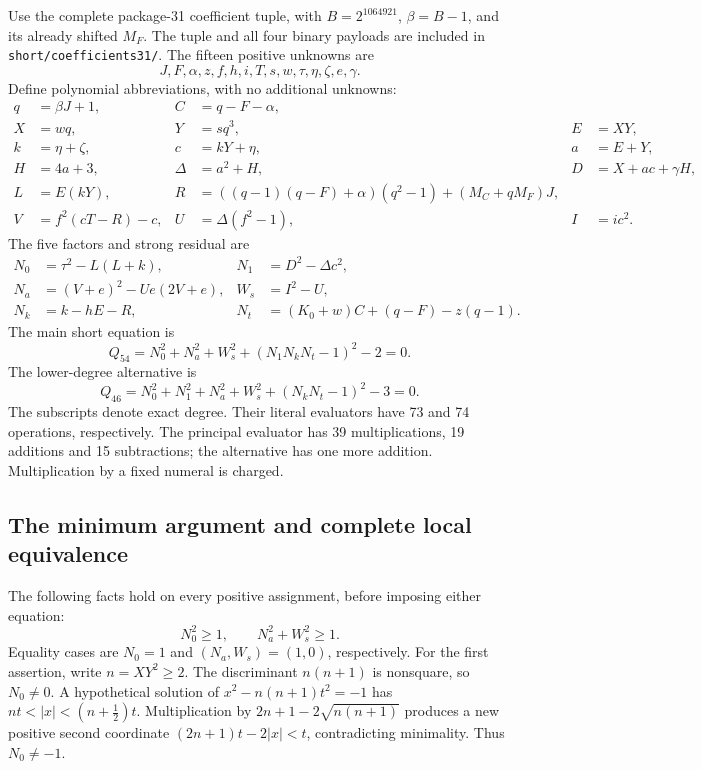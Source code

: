 Use the complete package-31 coefficient tuple, with $B=2^{1064921}$,
$\beta=B-1$, and its already shifted $M_F$. The tuple and all four binary
payloads are included in \texttt{short/coefficients31/}.
The fifteen positive unknowns are
\[
 J,F,\alpha,z,f,h,i,T,s,w,\tau,\eta,\zeta,e,\gamma.
\]
Define polynomial abbreviations, with no additional unknowns:
\begin{align*}
 q&=\beta J+1,& C&=q-F-\alpha,\\
 X&=wq,&Y&=sq^3,&E&=XY,\\
 k&=\eta+\zeta,&c&=kY+\eta,&a&=E+Y,\\
 H&=4a+3,&\Delta&=a^2+H,&D&=X+ac+\gamma H,\\
 L&=E(kY),&
 R&=((q-1)(q-F)+\alpha)(q^2-1)+(M_C+qM_F)J,\\
 V&=f^2(cT-R)-c,&U&=\Delta(f^2-1),&I&=ic^2.
\end{align*}
The five factors and strong residual are
\begin{align*}
 N_0&=\tau^2-L(L+k),&N_1&=D^2-\Delta c^2,\\
 N_a&=(V+e)^2-Ue(2V+e),&W_s&=I^2-U,\\
 N_k&=k-hE-R,&N_t&=(K_0+w)C+(q-F)-z(q-1).
\end{align*}
The main short equation is
\begin{equation}\label{eq:short54}
 \boxed{Q_{54}=N_0^2+N_a^2+W_s^2+(N_1N_kN_t-1)^2-2=0.}
\end{equation}
The lower-degree alternative is
\begin{equation}\label{eq:short46}
 \boxed{Q_{46}=N_0^2+N_1^2+N_a^2+W_s^2+(N_kN_t-1)^2-3=0.}
\end{equation}
The subscripts denote exact degree. Their literal evaluators have 73
and 74 operations, respectively. The principal evaluator has
39 multiplications, 19 additions and 15 subtractions; the alternative
has one more addition. Multiplication by a fixed numeral is charged.

\subsection{The minimum argument and complete local equivalence}

The following facts hold on every positive assignment, before imposing
either equation:
\begin{equation}\label{eq:min-blocks}
 N_0^2\geq1,\qquad N_a^2+W_s^2\geq1.
\end{equation}
Equality cases are $N_0=1$ and $(N_a,W_s)=(1,0)$, respectively.
For the first assertion, write $n=XY^2\geq2$. The discriminant $n(n+1)$
is nonsquare, so $N_0\ne0$. A hypothetical solution of
$x^2-n(n+1)t^2=-1$ has
$nt<|x|<(n+\tfrac12)t$. Multiplication by
$2n+1-2\sqrt{n(n+1)}$ produces a new positive second coordinate
$(2n+1)t-2|x|<t$, contradicting minimality. Thus $N_0\ne-1$.

